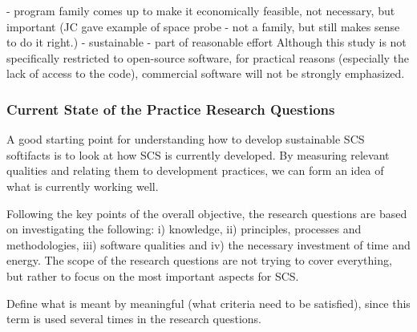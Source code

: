 \documentclass[12pt]{article}
\begin{document}
- program family comes up to make it economically feasible, not necessary, but
important (JC gave example of space probe - not a family, but still makes sense
to do it right.)
- sustainable - part of reasonable effort
Although this study is not specifically restricted to open-source software, for
practical reasons (especially the lack of access to the code), commercial
software will not be strongly emphasized.

\subsubsection*{Current State of the Practice Research Questions} \label{Sec_ResearchQuestions}

A good starting point for understanding how to develop sustainable SCS softifacts is
to look at how SCS is currently developed.  By measuring relevant qualities and
relating them to development practices, we can form an idea of what is currently
working well.

Following the key points of the overall objective, the research questions are
based on investigating the following: i) knowledge, ii) principles, processes
and methodologies, iii) software qualities and iv) the necessary investment of
time and energy.  The scope of the research questions are not trying to cover
everything, but rather to focus on the most important aspects for SCS.

Define what is meant by meaningful (what criteria need to be satisfied), since
this term is used several times in the research questions.
\end{document}
